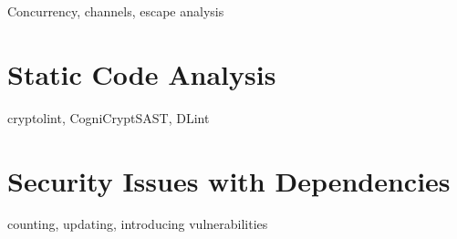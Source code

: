 Concurrency, channels, escape analysis \cite{wang2020, sibiryov2017, tu2019, giunti2020, lange2017, zhou2017, dilley2019, hill2002, hannan1998, choi1999}



\section{Static Code Analysis}\label{sec:related-work:static-code-analysis}

cryptolint, CogniCryptSAST, DLint \cite{egele2013, kruger2018, gong2015, smith2020, gabet2020}



\section{Security Issues with Dependencies}\label{sec:related-work:dependency-issues}

counting, updating, introducing vulnerabilities \cite{xia2014, mirhosseini2017, kula2017, watanabe2017, pashchenko2018}


